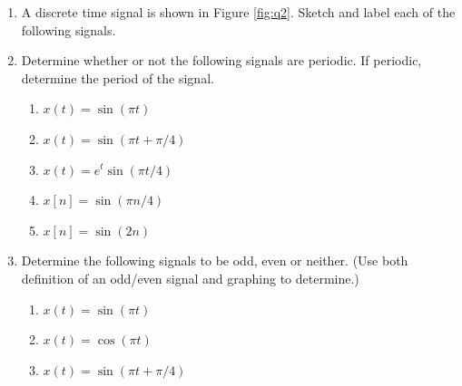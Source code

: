 \documentclass[12pt]{article}
\begin{document}
\begin{enumerate}
\item A discrete time signal is shown in Figure \ref{fig:q2}. Sketch and label each of the following signals.

\begin{center}
\label{fig:q2}
\end{center}

\item Determine whether or not the following signals are periodic. If periodic, determine the period of the signal.
\begin{enumerate}
    \item $x(t)=\sin (\pi t)$
    \item $x(t)=\sin (\pi t + \pi/4)$
    \item $x(t)=e^t \sin (\pi t /4)$
    \item $x[n]=\sin(\pi n/4)$
    \item $x[n]=\sin(2n)$
\end{enumerate}


\item Determine the following signals to be odd, even or neither. (Use both definition of an odd/even signal and graphing to determine.)
\begin{enumerate}
    \item $x(t)=\sin (\pi t)$
    \item $x(t)=\cos (\pi t)$
    \item $x(t)=\sin (\pi t + \pi/4)$
\end{enumerate}


\end{enumerate}
\end{document}
